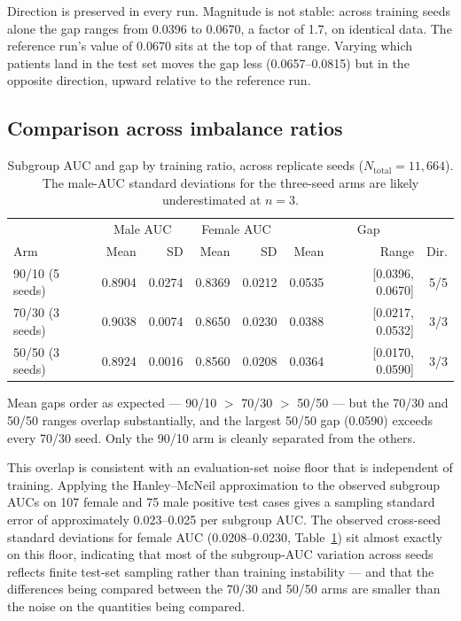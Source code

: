 \documentclass[11pt]{article}
\begin{document}
Direction is preserved in every run. Magnitude is not stable: across training seeds alone the gap ranges from 0.0396 to 0.0670, a factor of 1.7, on identical data. The reference run's value of 0.0670 sits at the top of that range. Varying which patients land in the test set moves the gap less (0.0657--0.0815) but in the opposite direction, upward relative to the reference run.

\subsection{Comparison across imbalance ratios}

\begin{table}[H]
\centering
\begin{tabular}{lrrrrrrr}
\toprule
& \multicolumn{2}{c}{Male AUC} & \multicolumn{2}{c}{Female AUC} & \multicolumn{3}{c}{Gap} \\
Arm & Mean & SD & Mean & SD & Mean & Range & Dir. \\
\midrule
90/10 (5 seeds) & 0.8904 & 0.0274 & 0.8369 & 0.0212 & 0.0535 & [0.0396, 0.0670] & 5/5 \\
70/30 (3 seeds) & 0.9038 & 0.0074 & 0.8650 & 0.0230 & 0.0388 & [0.0217, 0.0532] & 3/3 \\
50/50 (3 seeds) & 0.8924 & 0.0016 & 0.8560 & 0.0208 & 0.0364 & [0.0170, 0.0590] & 3/3 \\
\bottomrule
\end{tabular}
\caption{Subgroup AUC and gap by training ratio, across replicate seeds ($N_{\text{total}}=11{,}664$). The male-AUC standard deviations for the three-seed arms are likely underestimated at $n=3$.}
\label{tab:crossarm}
\end{table}

Mean gaps order as expected --- 90/10 $>$ 70/30 $>$ 50/50 --- but the 70/30 and 50/50 ranges overlap substantially, and the largest 50/50 gap (0.0590) exceeds every 70/30 seed. Only the 90/10 arm is cleanly separated from the others.

This overlap is consistent with an evaluation-set noise floor that is independent of training. Applying the Hanley--McNeil approximation \cite{hanley1982} to the observed subgroup AUCs on 107 female and 75 male positive test cases gives a sampling standard error of approximately 0.023--0.025 per subgroup AUC. The observed cross-seed standard deviations for female AUC (0.0208--0.0230, Table~\ref{tab:crossarm}) sit almost exactly on this floor, indicating that most of the subgroup-AUC variation across seeds reflects finite test-set sampling rather than training instability --- and that the differences being compared between the 70/30 and 50/50 arms are smaller than the noise on the quantities being compared.
\end{document}

